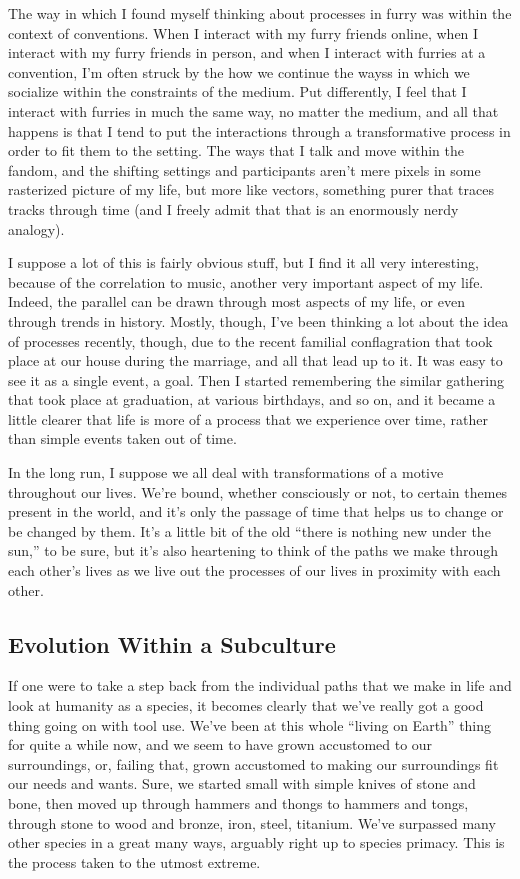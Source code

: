 The way in which I found myself thinking about processes in furry was within the context of conventions.  When I interact with my furry friends online, when I interact with my furry friends in person, and when I interact with furries at a convention, I'm often struck by the how we continue the wayss in which we socialize within the constraints of the medium.  Put differently, I feel that I interact with furries in much the same way, no matter the medium, and all that happens is that I tend to put the interactions through a transformative process in order to fit them to the setting.  The ways that I talk and move within the fandom, and the shifting settings and participants aren't mere pixels in some rasterized picture of my life, but more like vectors, something purer that traces tracks through time (and I freely admit that that is an enormously nerdy analogy).

I suppose a lot of this is fairly obvious stuff, but I find it all very interesting, because of the correlation to music, another very important aspect of my life.  Indeed, the parallel can be drawn through most aspects of my life, or even through trends in history.  Mostly, though, I've been thinking a lot about the idea of processes recently, though, due to the recent familial conflagration that took place at our house during the marriage, and all that lead up to it.  It was easy to see it as a single event, a goal.  Then I started remembering the similar gathering that took place at graduation, at various birthdays, and so on, and it became a little clearer that life is more of a process that we experience over time, rather than simple events taken out of time.

In the long run, I suppose we all deal with transformations of a motive throughout our lives. We're bound, whether consciously or not, to certain themes present in the world, and it's only the passage of time that helps us to change or be changed by them.  It's a little bit of the old ``there is nothing new under the sun,'' to be sure, but it's also heartening to think of the paths we make through each other's lives as we live out the processes of our lives in proximity with each other.

\subsection*{Evolution Within a Subculture}

If one were to take a step back from the individual paths that we make in life and look at humanity as a species, it becomes clearly that we've really got a good thing going on with tool use.  We've been at this whole ``living on Earth'' thing for quite a while now, and we seem to have grown accustomed to our surroundings, or, failing that, grown accustomed to making our surroundings fit our needs and wants.  Sure, we started small with simple knives of stone and bone, then moved up through hammers and thongs to hammers and tongs, through stone to wood and bronze, iron, steel, titanium.  We've surpassed many other species in a great many ways, arguably right up to species primacy.  This is the process taken to the utmost extreme.

